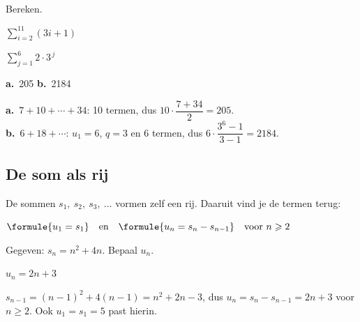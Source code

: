 \begin{oefeningen}
\begin{oefening}
Bereken.
\begin{reeks}[2]
  \item $\displaystyle\sum_{i=2}^{11} (3i + 1)$
  \item $\displaystyle\sum_{j=1}^{6} 2 \cdot 3^{\,j}$
\end{reeks}
\begin{solution}
\textbf{a.}~205 \quad \textbf{b.}~2184
\end{solution}
\begin{fullsolution}
\textbf{a.}~$7+10+\cdots+34$: 10 termen, dus $10\cdot\dfrac{7+34}{2}=205$.\\
\textbf{b.}~$6+18+\cdots$: $u_1=6$, $q=3$ en 6 termen, dus $6\cdot\dfrac{3^6-1}{3-1}=2184$.
\end{fullsolution}
\end{oefening}
\end{oefeningen}

\subsection{De som als rij}

\begin{theorie}
De sommen $s_1,\ s_2,\ s_3,\ \ldots$ vormen zelf een rij. Daaruit vind je de termen terug:

\vspace{1mm}
\qquad $\formule{u_1 = s_1} \quad\text{en}\quad \formule{u_n = s_n - s_{n-1}} \quad\text{voor } n \geqslant 2$
\end{theorie}


\begin{oefeningen}
\begin{oefening}
Gegeven: $s_n = n^2 + 4n$. Bepaal $u_n$.
\begin{solution}
$u_n=2n+3$
\end{solution}
\begin{fullsolution}
$s_{n-1}=(n-1)^2+4(n-1)=n^2+2n-3$, dus $u_n=s_n-s_{n-1}=2n+3$ voor $n\geqslant 2$. Ook $u_1=s_1=5$ past hierin.
\end{fullsolution}
\end{oefening}
\end{oefeningen}


